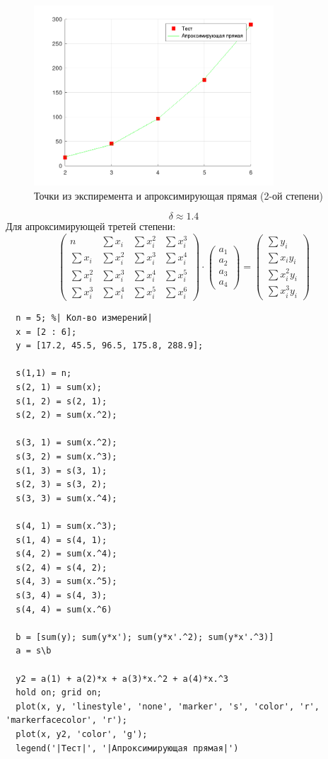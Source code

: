 \begin{figure}[H]
  \caption{Точки из экспиремента и апроксимирующая прямая (2-ой степени)}
  \label{fig:plot_7_2}
  \centering
  \includegraphics[width=0.8\textwidth]{images/task_7_2.png}
\end{figure}
\[
  \delta \approx 1.4
\]
Для апроксимирующей третей степени:
\[
  \begin{pmatrix}
    n & \sum x_{i} & \sum x_{i}^{2} & \sum x_{i}^{3} \\[1em]
    \sum x_{i} & \sum x_{i}^{2} & \sum x_{i}^{3} & \sum x_{i}^{4} \\[1em]
    \sum x_{i}^{2} & \sum x_{i}^{3} & \sum x_{i}^{4} & \sum x_{i}^{5} \\[1em]
    \sum x_{i}^{3} & \sum x_{i}^{4} & \sum x_{i}^{5} & \sum x_{i}^{6}
  \end{pmatrix}
  \cdot
  \begin{pmatrix}
    a_{1}\\[1em]
    a_{2}\\[1em]
    a_{3}\\[1em]
    a_{4}
  \end{pmatrix}
  =
  \begin{pmatrix}
    \sum y_{i} \\[1em]
    \sum x_{i}y_{i} \\[1em]
    \sum x_{i}^{2}y_{i} \\[1em]
    \sum x_{i}^{3}y_{i}
  \end{pmatrix}
\]
\begin{lstlisting}
  n = 5; %| Кол-во измерений|
  x = [2 : 6];
  y = [17.2, 45.5, 96.5, 175.8, 288.9];

  s(1,1) = n;
  s(2, 1) = sum(x);
  s(1, 2) = s(2, 1);
  s(2, 2) = sum(x.^2);

  s(3, 1) = sum(x.^2);
  s(3, 2) = sum(x.^3);
  s(1, 3) = s(3, 1);
  s(2, 3) = s(3, 2);
  s(3, 3) = sum(x.^4);

  s(4, 1) = sum(x.^3);
  s(1, 4) = s(4, 1);
  s(4, 2) = sum(x.^4);
  s(2, 4) = s(4, 2);
  s(4, 3) = sum(x.^5);
  s(3, 4) = s(4, 3);
  s(4, 4) = sum(x.^6)

  b = [sum(y); sum(y*x'); sum(y*x'.^2); sum(y*x'.^3)]
  a = s\b

  y2 = a(1) + a(2)*x + a(3)*x.^2 + a(4)*x.^3
  hold on; grid on;
  plot(x, y, 'linestyle', 'none', 'marker', 's', 'color', 'r', 'markerfacecolor', 'r');
  plot(x, y2, 'color', 'g');
  legend('|Тест|', '|Апроксимирующая прямая|')
\end{lstlisting}
